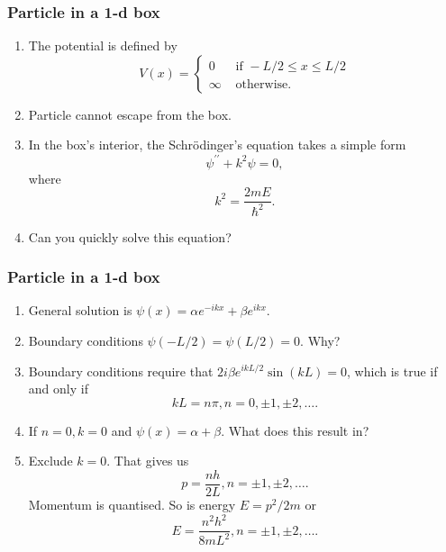 \documentclass{beamer}
\begin{document}
\begin{frame}
\frametitle{Particle in a 1-d box}
\begin{enumerate}
\item The potential is defined by
\begin{equation}\label{e5}
V(x) = \begin{cases} 0 & \text{ if } -L/2 \le x \le L/2 \\
\infty & \text{ otherwise.}
\end{cases}
\end{equation}
\item Particle cannot escape from the box.
\item In the box's interior, the Schr\"{o}dinger's equation takes a simple
form
\begin{equation}\label{e6}
\psi^{\prime\prime} + k^2\psi = 0,
\end{equation}
where
\begin{equation}\label{e7}
k^2 = \frac{2mE}{\hslash^2}.
\end{equation}
\item Can you quickly solve this equation?
\end{enumerate}
\end{frame}

\begin{frame}
\frametitle{Particle in a 1-d box}
\begin{enumerate}
\item General solution is $\psi(x) = \alpha e^{-ikx} + \beta e^{ikx}$.
\item Boundary conditions $\psi(-L/2) = \psi(L/2) = 0$. Why?
\item Boundary conditions require that $2i\beta e^{ikL/2}\sin(kL) = 0$, which is
true if and only if
\begin{equation}\label{e8}
kL = n\pi, n = 0, \pm 1, \pm 2, \ldots.
\end{equation}
\item If $n = 0, k = 0$ and $\psi(x) = \alpha + \beta$. What does this result 
in?
\item Exclude $k = 0$. That gives us
\begin{equation}\label{e9}
p = \frac{nh}{2L}, n = \pm 1, \pm 2, \ldots.
\end{equation}
Momentum is quantised. So is energy $E = p^2/2m$ or
\begin{equation}\label{e10}
E = \frac{n^2h^2}{8mL^2}, n = \pm 1, \pm 2, \ldots.
\end{equation}
\end{enumerate}
\end{frame}
\end{document}
